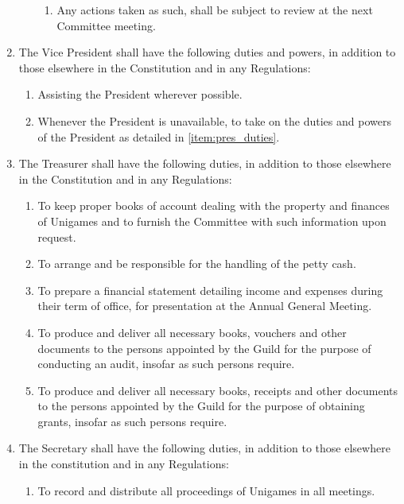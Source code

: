 \documentclass[a4paper]{article}
\begin{document}
\begin{enumerate}
\begin{enumerate}
\begin{enumerate}
                        \item Any actions taken as such, shall be subject to review at the next Committee meeting.
                    \end{enumerate}
          \end{enumerate}
    \item The Vice President shall have the following duties and powers, in addition to those elsewhere in the Constitution and in any Regulations:
          \begin{enumerate}
              \item Assisting the President wherever possible.
              \item Whenever the President is unavailable, to take on the duties and powers of the President as detailed in \cref{item:pres_duties}.
          \end{enumerate}
    \item The Treasurer shall have the following duties, in addition to those elsewhere in the Constitution and in any Regulations:
          \begin{enumerate}
                \item To keep proper books of account dealing with the property and finances of Unigames and to furnish the Committee with such information upon request.
                \item To arrange and be responsible for the handling of the petty cash.
                \item To prepare a financial statement detailing income and expenses during their term of office, for presentation at the Annual General Meeting.
                \item To produce and deliver all necessary books, vouchers and other documents to the persons appointed by the Guild for the purpose of conducting an audit, insofar as such persons require.
                \item To produce and deliver all necessary books, receipts and other documents to the persons appointed by the Guild for the purpose of obtaining grants, insofar as such persons require.
          \end{enumerate}
    \item The Secretary shall have the following duties, in addition to those elsewhere in the constitution and in any Regulations:
          \begin{enumerate}
              \item To record and distribute all proceedings of Unigames in all meetings.

\end{enumerate}
\end{enumerate}
\end{document}

